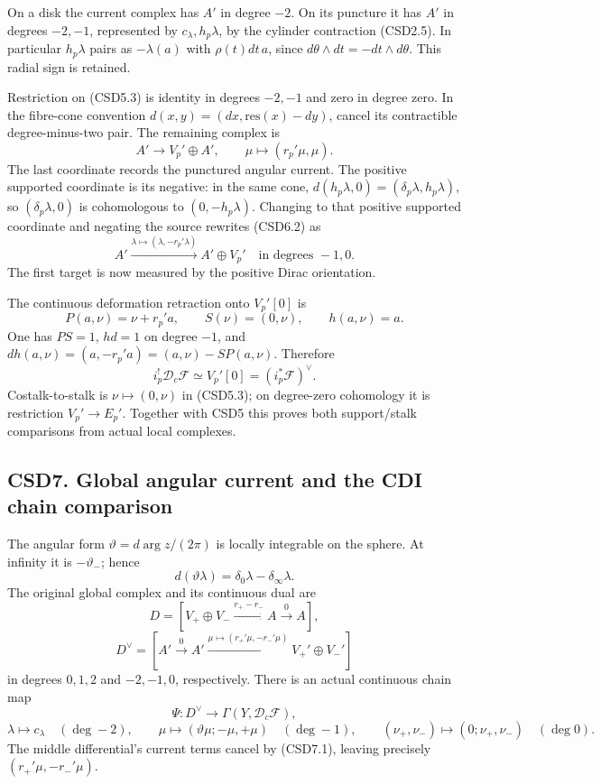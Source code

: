 On a disk the current complex has \(A'\) in degree \(-2\). On its
puncture it has \(A'\) in degrees \(-2,-1\), represented by
\(c_\lambda,h_p\lambda\), by the cylinder contraction (CSD2.5). In
particular \(h_p\lambda\) pairs as \(-\lambda(a)\) with
\(\rho(t)dt\,a\), since \(d\theta\wedge dt=-dt\wedge d\theta\). This
radial sign is retained.

Restriction on (CSD5.3) is identity in degrees \(-2,-1\) and zero in
degree zero. In the fibre-cone convention
\(d(x,y)=(dx,\mathrm{res}(x)-dy)\), cancel its contractible
degree-minus-two pair. The remaining complex is \[
A'\longrightarrow V_p'\oplus A',\qquad
\mu\longmapsto(r_p'\mu,\mu).
\tag{CSD6.2}
\] The last coordinate records the punctured angular current. The
positive supported coordinate is its negative: in the same cone,
\(d(h_p\lambda,0)=(\delta_p\lambda,h_p\lambda)\), so
\((\delta_p\lambda,0)\) is cohomologous to \((0,-h_p\lambda)\). Changing
to that positive supported coordinate and negating the source rewrites
(CSD6.2) as \[
A'\xrightarrow{\lambda\mapsto(\lambda,-r_p'\lambda)}
A'\oplus V_p'\quad\text{in degrees }-1,0.
\tag{CSD6.3}
\] The first target is now measured by the positive Dirac orientation.

The continuous deformation retraction onto \(V_p'[0]\) is \[
P(a,\nu)=\nu+r_p'a,\qquad S(\nu)=(0,\nu),\qquad h(a,\nu)=a.
\tag{CSD6.4}
\] One has \(PS=1\), \(hd=1\) on degree \(-1\), and
\(dh(a,\nu)=(a,-r_p'a)=(a,\nu)-SP(a,\nu)\). Therefore \[
\boxed{i_p^!\mathscr D_c\mathscr F\simeq V_p'[0]
=(i_p^*\mathscr F)^\vee.}
\tag{CSD6.5}
\] Costalk-to-stalk is \(\nu\mapsto(0,\nu)\) in (CSD5.3); on degree-zero
cohomology it is restriction \(V_p'\to E_p'\). Together with CSD5 this
proves both support/stalk comparisons from actual local complexes.

\subsection{CSD7. Global angular current and the CDI chain
comparison}\label{csd7.-global-angular-current-and-the-cdi-chain-comparison}

The angular form \(\vartheta=d\arg z/(2\pi)\) is locally integrable on
the sphere. At infinity it is \(-\vartheta_-\); hence \[
d(\vartheta\lambda)=\delta_0\lambda-\delta_\infty\lambda.
\tag{CSD7.1}
\] The original global complex and its continuous dual are \[
D=[V_+\oplus V_-\xrightarrow{r_+-r_-}A\xrightarrow0 A],
\] \[
D^\vee=[A'\xrightarrow0 A'
\xrightarrow{\mu\mapsto(r_+'\mu,-r_-'\mu)}
V_+'\oplus V_-']
\tag{CSD7.2}
\] in degrees \(0,1,2\) and \(-2,-1,0\), respectively. There is an
actual continuous chain map \[
\Psi:D^\vee\longrightarrow\Gamma(Y,\mathscr D_c\mathscr F),
\] \[
\lambda\mapsto c_\lambda\quad(\deg-2),\qquad
\mu\mapsto(\vartheta\mu;-\mu,+\mu)\quad(\deg-1),\qquad
(\nu_+,\nu_-)\mapsto(0;\nu_+,\nu_-)\quad(\deg0).
\tag{CSD7.3}
\] The middle differential's current terms cancel by (CSD7.1), leaving
precisely \((r_+'\mu,-r_-'\mu)\).

